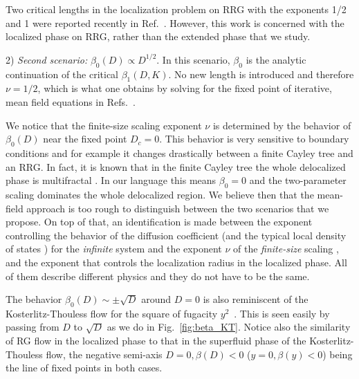 \documentclass[reprint,aps,prl,superscriptaddress,english,nolongbibliography]{revtex4-1}
\begin{document}
Two critical lengths in the localization problem on RRG with the exponents 1/2 and 1 were reported recently in Ref.~\cite{Mata2020two}. However, this work is concerned with the localized phase on RRG, rather than the extended phase that we study.

2) {\it Second scenario:} $\beta_0(D)\propto D^{1/2}$. In this scenario, $\beta_0$ is the analytic continuation of the critical $\beta_1(D,K)$. No new length is introduced and therefore $\nu=1/2$, which is what one obtains by solving for the fixed point of iterative, mean field equations in Refs.~\cite{tikhonov2016Anderson,tikhonov2021AndersonMBL,zirnbauer1986localization,mirlin1991localization}.

We notice that the finite-size scaling exponent $\nu$ is determined by the behavior of $\beta_{0}(D)$ near the fixed point $D_{c}=0$. This behavior is very sensitive to boundary conditions and for example it changes drastically between a finite Cayley tree and an RRG. In fact, it is known that in the finite Cayley tree the whole delocalized phase is multifractal 
\cite{monthus2011anderson,tikhonov2016fractality}. In our language this means $\beta_{0}=0$ and the two-parameter scaling dominates the whole delocalized region. We believe then that the mean-field approach is too rough to distinguish between the two scenarios that we propose. On top of that, an identification is made between the exponent controlling the behavior of the diffusion coefficient \cite{zirnbauer1986localization} (and the typical local density of states \cite{Tikhonov2019Critical}) for the {\it infinite} system and the exponent $\nu$ of the {\it finite-size} scaling \cite{Mata2020two, Pino2020Scaling}, and the exponent that controls the localization radius in the localized phase. All of them describe different physics and they do not have to be the same.

The behavior $\beta_0(D)\sim \pm\sqrt{D}$ around $D=0$ is also reminiscent of the Kosterlitz-Thouless flow for the square of fugacity $y^{2}$~\cite{1972JETP...34..610B,1971JETP...32..493B,1973JPhC....6.1181K}. This is seen easily by passing from $D$ to $\sqrt{D}$ as we do in Fig.~\ref{fig:beta_KT}. Notice also the similarity of RG flow in the localized phase to that in the superfluid phase of the Kosterlitz-Thouless flow, the negative semi-axis $D=0, \beta(D)<0$ ($y=0, \beta(y)<0$) being the line of fixed points in both cases.
\end{document}
